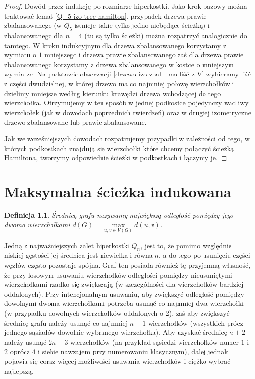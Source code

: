 \documentclass{pracamgr}
\newtheorem{defi}[theorem]{Definicja}
\begin{document}
    \begin{proof}
     Dowód przez indukcję po rozmiarze hiperkostki. Jako krok bazowy można traktować lemat \ref{Q_5-izo tree hamilton}, przypadek drzewa prawie zbalansowanego
     (w $Q_5$ istnieje takie tylko jedno niebędące ścieżką) i zbalansowanego dla $n=4$ (tu są tylko ścieżki) można rozpatrzyć analogicznie do tamtego.
     W kroku indukcyjnym dla drzewa zbalansowanego korzystamy z wymiaru o $1$ mniejszego i drzewa prawie zbalansowanego 
     zaś dla drzewa prawie zbalansowanego korzystamy z drzewa zbalansowanego w kostce o mniejszym wymiarze.
     Na podstawie obserwacji \ref{drzewo izo zbal - ma liść z V} wybieramy liść z części dwudzielnej, w której drzewo
     ma co najmniej połowę wierzchołków i dzielimy mniejsze według kierunku krawędzi drzewa wchodzącej do tego wierzchołka.
     Otrzymujemy w ten sposób w jednej podkostce pojedynczy wadliwy wierzchołek (jak w dowodach poprzednich twierdzeń)
     oraz w drugiej izometryczne drzewo zbalansowane lub prawie zbalansowane.
     
     Jak we wcześniejszych dowodach rozpatrujemy przypadki w zależności od tego, w których podkostkach znajdują się wierzchołki
     które chcemy połączyć ścieżką Hamiltona, tworzymy odpowiednie ścieżki w podkostkach i łączymy je.
    \end{proof}

  \chapter{Maksymalna ścieżka indukowana}
   \begin{defi}\label{srednica grafu}
    \emph{Średnicą grafu} nazywamy największą odległość pomiędzy jego dwoma wierzchołkami $d(G)=\max\limits_{u,v\in V(G)}d(u,v)$.
   \end{defi}
   Jedną z najważniejszych zalet hiperkostki $Q_n$, jest to, że pomimo względnie niskiej gęstości jej średnica jest niewielka i równa $n$,
   a do tego po usunięciu części węzłów często pozostaje spójna.
   Graf ten posiada również tę przyjemną własność, że przy losowym usuwaniu wierzchołków odległości pomiędzy nieusuniętymi wierzchołkami rzadko się zwiększają
   (w szczególności dla wierzchołków bardziej oddalonych).
   Przy intencjonalnym usuwaniu, aby zwiększyć odległość pomiędzy dowolnymi dwoma wierzchołkami potrzeba usunąć co najmniej dwa wierzchołki
   (w przypadku dowolnych wierzchołków oddalonych o 2), zaś aby zwiększyć średnicę grafu należy usunąć co najmniej $n-1$ wierzchołków
   (wszystkich prócz jednego sąsiadów dowolnie wybranego wierzchołka).
   Aby uzyskać średnicę $n+2$ należy usunąć $2n-3$ wierzchołków
   (na przykład sąsiedzi wierzchołków numer $1$ i $2$ oprócz $4$ i siebie nawzajem przy numerowaniu klasycznym),
   dalej jednak pojawia się coraz więcej możliwości usuwania wierzchołków i ciężko wybrać najlepszą.
    
\end{document}
